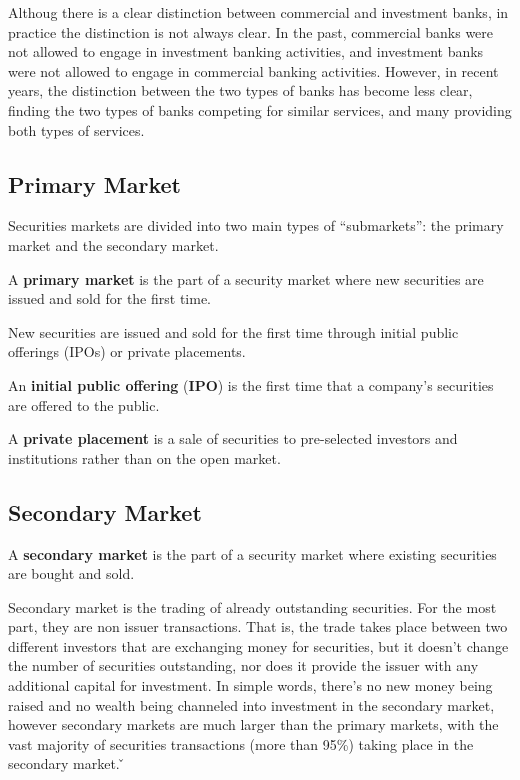 Althoug there is a clear distinction between commercial and investment banks, in practice the distinction is not always
clear. In the past, commercial banks were not allowed to engage in investment banking activities, and investment banks
were not allowed to engage in commercial banking activities. However, in recent years, the distinction between the two
types of banks has become less clear, finding the two types of banks competing for similar services, and many providing
both types of services.

\subsection{Primary Market}

Securities markets are divided into two main types of ``submarkets'': the primary market and the secondary market.

A \textbf{primary market} is the part of a security market where new securities are issued and sold for the first time.
\ed

New securities are issued and sold for the first time through initial public offerings (IPOs) or private placements.

An \textbf{initial public offering} (\textbf{IPO}) is the first time that a company's securities are offered to the
public.
\ed

A \textbf{private placement} is a sale of securities to pre-selected investors and institutions rather than on the
open market.
\ed

\subsection{Secondary Market}

A \textbf{secondary market} is the part of a security market where existing securities are bought and sold.
\ed

Secondary market is the trading of already outstanding securities. For the most part, they are non issuer
transactions. That is, the trade takes place between two different investors that are exchanging money for securities,
but it doesn't change the number of securities outstanding, nor does it provide the issuer with any additional
capital for investment. In simple words, there's no new money being raised and no wealth being channeled into
investment in the secondary market, however secondary markets are much larger than the primary markets, with the vast
majority of securities transactions (more than 95\%) taking place in the secondary market. \v

